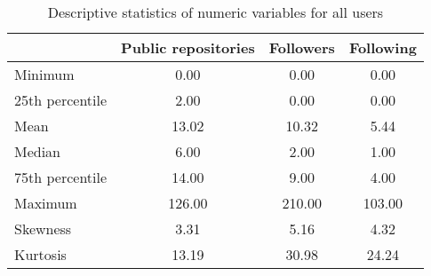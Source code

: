 \begin{table}
\centering
\caption{Descriptive statistics of numeric variables for all users}
\label{tab:stats_users}
\begin{tabular}{lccc}
\toprule
{} &  Public repositories &  Followers &  Following \\
\midrule
Minimum         &                 0.00 &       0.00 &       0.00 \\
25th percentile &                 2.00 &       0.00 &       0.00 \\
Mean            &                13.02 &      10.32 &       5.44 \\
Median          &                 6.00 &       2.00 &       1.00 \\
75th percentile &                14.00 &       9.00 &       4.00 \\
Maximum         &               126.00 &     210.00 &     103.00 \\
Skewness        &                 3.31 &       5.16 &       4.32 \\
Kurtosis        &                13.19 &      30.98 &      24.24 \\
\bottomrule
\end{tabular}
\end{table}
